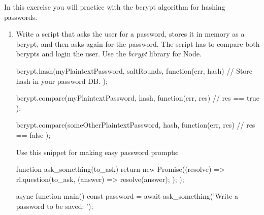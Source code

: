 \begin{Exercise}[label={basic-js-crypto-bcrypt}]
In this exercise you will practice with the bcrypt algorithm for hashing passwords.

\begin{enumerate}[1.]
\item Write a script that asks the user for a password, stores it in memory as a bcrypt, and then asks again for the password. The script has to compare both bcrypts and login the user. Use the \textit{bcrypt} library for Node.

\begin{js}
bcrypt.hash(myPlaintextPassword, saltRounds, function(err, hash) {
// Store hash in your password DB.
});

bcrypt.compare(myPlaintextPassword, hash, function(err, res) {
// res == true
});

bcrypt.compare(someOtherPlaintextPassword, hash, function(err, res) {
// res == false
});
\end{js}

Use this snippet for making easy password prompts:
\begin{js}
function ask_something(to_ask) {
  return new Promise((resolve) => {
    rl.question(to_ask, (answer) => {
      resolve(answer);
    });
  });
}

async function main() {
  const password = await ask_something('Write a password to be saved: ');
}
\end{js}
\end{enumerate}
\end{Exercise}

